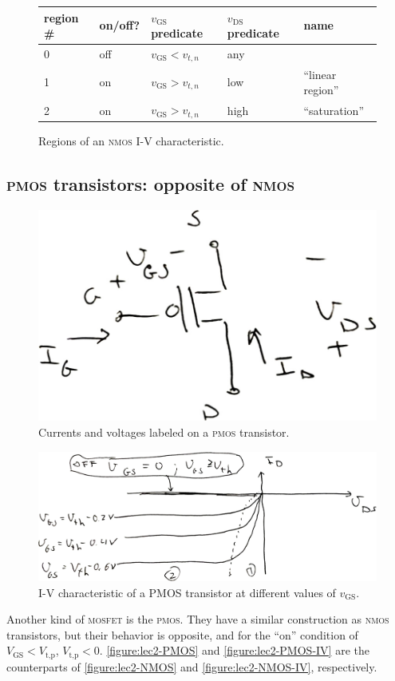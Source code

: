 \begin{figure}
  \centering
  \begin{tabular}{lllll}
    region \# & on/off? &
    \(v_\text{GS}\) predicate & \(v_\text{DS}\) predicate
    & name\\\hline
    0 & off & \(v_\text{GS} < v_{t,n}\) & any & \\
    1 & on & \(v_\text{GS} > v_{t,n}\) & low & ``linear region''\\
    2 & on & \(v_\text{GS} > v_{t,n}\) & high & ``saturation''
  \end{tabular}
  \caption{Regions of an \textsc{nmos} I-V characteristic.}
  \label{figure:lec2-NMOS-regime-table}
\end{figure}

\subsection{\textsc{pmos} transistors: opposite of \textsc{nmos}}
\begin{figure}
  \centering
  \includegraphics[width=0.5\linewidth]{figures/PMOS-currents-voltages}
  \caption{Currents and voltages labeled on a \textsc{pmos} transistor.}
  \label{figure:lec2-PMOS}
\end{figure}
\begin{figure}
  \centering
  \includegraphics[width=\linewidth]{figures/PMOS-IV}
  \caption{I-V characteristic of a \textsc{PMOS} transistor at different values of \(v_\text{GS}\).}
  \label{figure:lec2-PMOS-IV}
\end{figure}
Another kind of \textsc{mosfet} is the \textsc{pmos}.
They have a similar construction as \textsc{nmos} transistors, but their
behavior is opposite, and for the ``on'' condition of \(V_\text{GS} < V_\text{t,p}\), \(V_\text{t,p} < 0\).
\autoref{figure:lec2-PMOS} and \autoref{figure:lec2-PMOS-IV}
are the counterparts of \autoref{figure:lec2-NMOS} and
\autoref{figure:lec2-NMOS-IV}, respectively.

